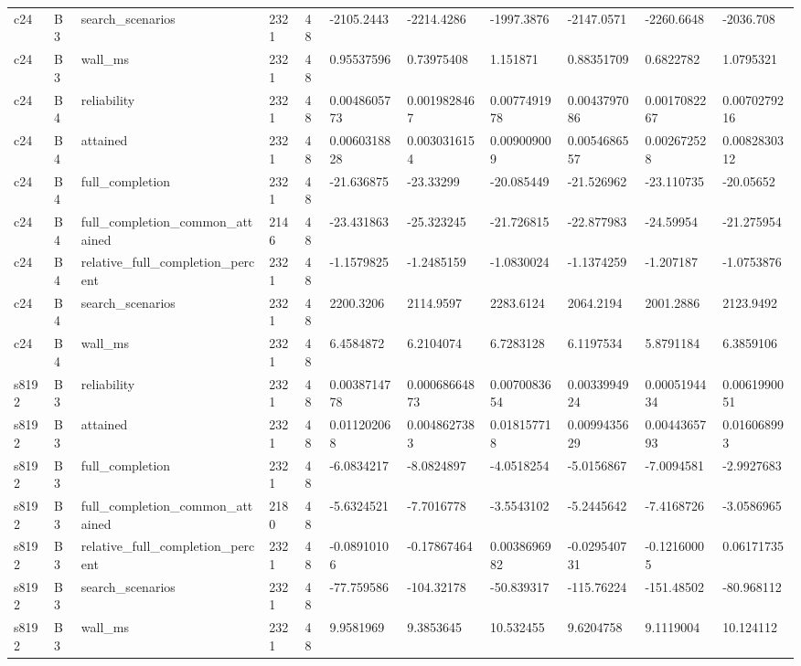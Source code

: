 \begin{longtable}{lllllllllll}
c24 & B3 & search\_scenarios & 2321 & 48 & -2105.2443 & -2214.4286 & -1997.3876 & -2147.0571 & -2260.6648 & -2036.708 \\
c24 & B3 & wall\_ms & 2321 & 48 & 0.95537596 & 0.73975408 & 1.151871 & 0.88351709 & 0.6822782 & 1.0795321 \\
c24 & B4 & reliability & 2321 & 48 & 0.0048605773 & 0.0019828467 & 0.0077491978 & 0.0043797086 & 0.0017082267 & 0.0070279216 \\
c24 & B4 & attained & 2321 & 48 & 0.0060318828 & 0.0030316154 & 0.009009009 & 0.0054686557 & 0.002672528 & 0.0082830312 \\
c24 & B4 & full\_completion & 2321 & 48 & -21.636875 & -23.33299 & -20.085449 & -21.526962 & -23.110735 & -20.05652 \\
c24 & B4 & full\_completion\_common\_attained & 2146 & 48 & -23.431863 & -25.323245 & -21.726815 & -22.877983 & -24.59954 & -21.275954 \\
c24 & B4 & relative\_full\_completion\_percent & 2321 & 48 & -1.1579825 & -1.2485159 & -1.0830024 & -1.1374259 & -1.207187 & -1.0753876 \\
c24 & B4 & search\_scenarios & 2321 & 48 & 2200.3206 & 2114.9597 & 2283.6124 & 2064.2194 & 2001.2886 & 2123.9492 \\
c24 & B4 & wall\_ms & 2321 & 48 & 6.4584872 & 6.2104074 & 6.7283128 & 6.1197534 & 5.8791184 & 6.3859106 \\
s8192 & B3 & reliability & 2321 & 48 & 0.0038714778 & 0.00068664873 & 0.0070083654 & 0.0033994924 & 0.0005194434 & 0.0061990051 \\
s8192 & B3 & attained & 2321 & 48 & 0.011202068 & 0.0048627383 & 0.018157718 & 0.0099435629 & 0.0044365793 & 0.016068993 \\
s8192 & B3 & full\_completion & 2321 & 48 & -6.0834217 & -8.0824897 & -4.0518254 & -5.0156867 & -7.0094581 & -2.9927683 \\
s8192 & B3 & full\_completion\_common\_attained & 2180 & 48 & -5.6324521 & -7.7016778 & -3.5543102 & -5.2445642 & -7.4168726 & -3.0586965 \\
s8192 & B3 & relative\_full\_completion\_percent & 2321 & 48 & -0.08910106 & -0.17867464 & 0.0038696982 & -0.029540731 & -0.12160005 & 0.06171735 \\
s8192 & B3 & search\_scenarios & 2321 & 48 & -77.759586 & -104.32178 & -50.839317 & -115.76224 & -151.48502 & -80.968112 \\
s8192 & B3 & wall\_ms & 2321 & 48 & 9.9581969 & 9.3853645 & 10.532455 & 9.6204758 & 9.1119004 & 10.124112 \\

\end{longtable}
